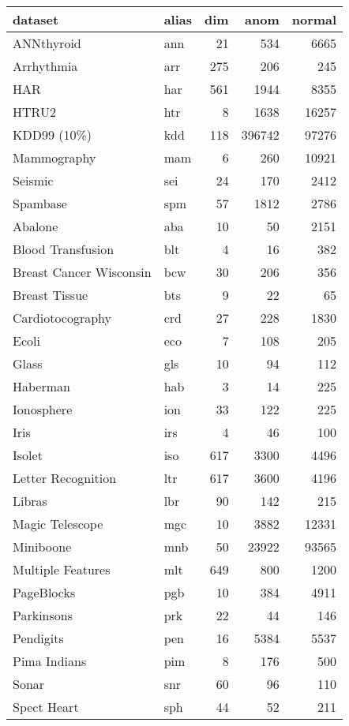 \begin{table}
\centering
\tabcolsep=0.1cm
\begin{tabular}{llrrr}
\toprule
\textbf{dataset} & \textbf{alias} & \textbf{dim} & \textbf{anom} & \textbf{normal}   \\\midrule
ANNthyroid & ann  & 21 & 534 & 6665 \\
Arrhythmia & arr  & 275 & 206 & 245 \\
HAR & har & 561 & 1944 & 8355  \\
HTRU2 & htr & 8 & 1638 & 16257  \\
KDD99 (10\%) & kdd & 118 & 396742 & 97276  \\
Mammography & mam & 6 & 260 & 10921  \\
Seismic & sei  & 24 & 170 & 2412  \\
Spambase & spm & 57 & 1812 & 2786  \\
\midrule
Abalone & aba & 10 & 50 & 2151  \\
Blood Transfusion & blt & 4 & 16 & 382  \\
Breast Cancer Wisconsin & bcw  & 30 & 206 & 356 \\
Breast Tissue & bts & 9 & 22 & 65 \\
Cardiotocography & crd & 27 & 228 & 1830  \\
Ecoli & eco & 7 & 108 & 205  \\
Glass & gls & 10 & 94 & 112  \\
Haberman & hab & 3 & 14 & 225  \\
Ionosphere & ion & 33 & 122 & 225  \\
Iris & irs & 4 & 46 & 100  \\
Isolet & iso & 617 & 3300 & 4496  \\
Letter Recognition & ltr & 617 & 3600 & 4196  \\
Libras & lbr & 90 & 142 & 215  \\
Magic Telescope & mgc & 10 & 3882 & 12331  \\
Miniboone & mnb & 50 & 23922 & 93565  \\
Multiple Features & mlt & 649 & 800 & 1200  \\
PageBlocks & pgb & 10 & 384 & 4911  \\
Parkinsons & prk & 22 & 44 & 146  \\
Pendigits & pen & 16 & 5384 & 5537  \\
Pima Indians & pim & 8 & 176 & 500  \\
Sonar & snr & 60 & 96 & 110  \\
Spect Heart & sph & 44 & 52 & 211  \\

\end{tabular}
\end{table}
